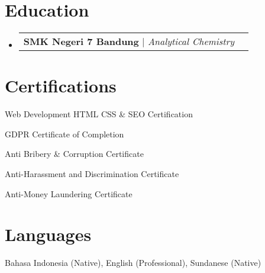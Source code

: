 \documentclass[a4paper, 11pt]{article}
\makeatletter
\newcommand{\resumeProjectHeading}[2]{
    \item
    \begin{tabular*}{0.987\textwidth}{l@{\extracolsep{\fill}}r}
      \small#1\\
    \end{tabular*}\vspace{-7pt}
}
\newcommand{\resumeSubHeadingListStart}{\begin{itemize}[leftmargin=0.1in, label={}]}
\newcommand{\resumeSubHeadingListEnd}{\end{itemize}\vspace{5pt}}
\makeatother
\begin{document}
\section{Education}
    \resumeSubHeadingListStart
        \resumeProjectHeading
            {\textbf{SMK Negeri 7 Bandung} $|$ \emph{Analytical Chemistry}}{2009 -- 2011}
    \resumeSubHeadingListEnd

\section{Certifications}
    \resumeSubHeadingListStart
        \small{
            \item Web Development HTML CSS \& SEO Certification
            \item GDPR Certificate of Completion
            \item Anti Bribery \& Corruption Certificate
            \item Anti-Harassment and Discrimination Certificate
            \item Anti-Money Laundering Certificate
        }
    \resumeSubHeadingListEnd

\section{Languages}
    \resumeSubHeadingListStart
        \small{
            \item Bahasa Indonesia (Native), English (Professional), Sundanese (Native)
        }
    \resumeSubHeadingListEnd
\end{document}
